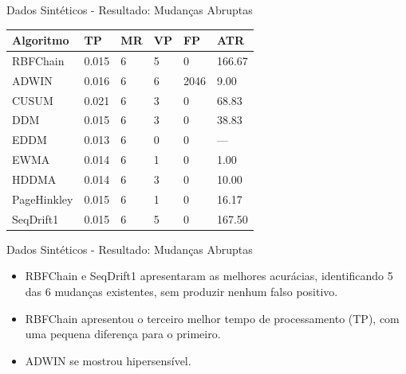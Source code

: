 \documentclass[10pt]{beamer}
\begin{document}
\begin{frame}{Dados Sintéticos - Resultado: Mudanças Abruptas}
    \begin{table}[ht]
        \centering
        \begin{tabular}{llllll}

    \toprule
    Algoritmo              & TP                     & MR                     & VP                     & FP                     & ATR                    \\
    \midrule
    RBFChain               & 0.015                  & 6                      & 5                      & 0                      & 166.67                 \\
    ADWIN                  & 0.016                  & 6                      & 6                      & 2046                   & 9.00                   \\
    CUSUM                  & 0.021                  & 6                      & 3                      & 0                      & 68.83                  \\
    DDM                    & 0.015                  & 6                      & 3                      & 0                      & 38.83                  \\
    EDDM                   & 0.013                  & 6                      & 0                      & 0                      & ---                    \\
    EWMA                   & 0.014                  & 6                      & 1                      & 0                      & 1.00                   \\
    HDDMA                  & 0.014                  & 6                      & 3                      & 0                      & 10.00                    \\
    PageHinkley            & 0.015                  & 6                      & 1                      & 0                      & 16.17                  \\
    SeqDrift1              & 0.015                  & 6                      & 5                      & 0                      & 167.50                 \\
    \bottomrule

        \end{tabular}
        \end{table}
\end{frame}

\begin{frame}{Dados Sintéticos - Resultado: Mudanças Abruptas}
    \begin{itemize}
        \item RBFChain e SeqDrift1 apresentaram as melhores acurácias, identificando 5 das 6 mudanças existentes, sem produzir nenhum falso positivo.
        \item RBFChain apresentou o terceiro melhor tempo de processamento (TP), com uma pequena diferença para o primeiro.
        \item ADWIN se mostrou hipersensível.
    \end{itemize}
\end{frame}
\end{document}

